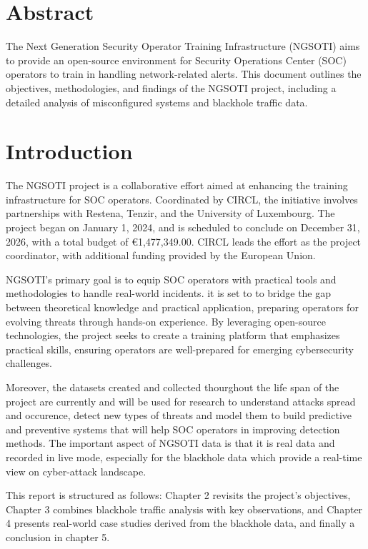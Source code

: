 \chapter*{Abstract}
The Next Generation Security Operator Training Infrastructure (NGSOTI) aims to provide an open-source environment for Security Operations Center (SOC) operators to train in handling network-related alerts. This document outlines the objectives, methodologies, and findings of the NGSOTI project, including a detailed analysis of misconfigured systems and blackhole traffic data.

\tableofcontents

\chapter{Introduction}
The NGSOTI project is a collaborative effort aimed at enhancing the training infrastructure for SOC operators. Coordinated by CIRCL, the initiative involves partnerships with Restena, Tenzir, and the University of Luxembourg. The project began on January 1, 2024, and is scheduled to conclude on December 31, 2026, with a total budget of €1,477,349.00. CIRCL leads the effort as the project coordinator, with additional funding provided by the European Union.

NGSOTI's primary goal is to equip SOC operators with practical tools and methodologies to handle real-world incidents. {\color{red} it is set to to bridge the gap between theoretical knowledge and practical application, preparing operators for evolving threats through hands-on experience}. By leveraging open-source technologies, the project seeks to create a training platform that emphasizes practical skills, ensuring operators are well-prepared for emerging cybersecurity challenges. 

{\color{red}Moreover, the datasets created and collected thourghout the life span of the project are currently and will be used for research to understand attacks spread and occurence, detect new types of threats and model them to build predictive and preventive systems that will help SOC operators in improving detection methods. The important aspect of NGSOTI data is that it is real data and recorded in live mode, especially for the blackhole data which provide a real-time view on cyber-attack landscape.}

{\color{red}This report is structured as follows: Chapter 2 revisits the project's objectives, Chapter 3 combines blackhole traffic analysis with key observations, and Chapter 4 presents real-world case studies derived from the blackhole data, and finally a conclusion in chapter 5.}


